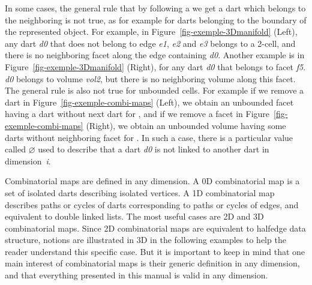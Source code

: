 In some cases, the general rule that by following a \betai{} we get a
dart which belongs to the neighboring  is not true, as for example
for darts belonging to the boundary of the represented
object. For example, in Figure~\ref{fig-exemple-3Dmanifold} (Left), any dart
\emph{d0} that does not belong to edge \emph{e1}, \emph{e2} and \emph{e3}
belongs to a 2-cell, and there is no neighboring facet along the edge containing \emph{d0}.
Another example is in Figure~\ref{fig-exemple-3Dmanifold} (Right), for
any dart \emph{d0} that belongs to facet \emph{f5}.
\emph{d0} belongs to volume \emph{vol2}, but there is no neighboring volume
along this facet.  The general rule is also not true for unbounded
cells. For example if we remove a dart in
Figure~\ref{fig-exemple-combi-maps} (Left), we obtain an unbounded
facet having a dart without next dart for \betaun{}, and if we remove
a facet in Figure~\ref{fig-exemple-combi-maps} (Right), we obtain an
unbounded volume having some darts without neighboring facet for
\betadeux{}.  In such a case, there is a particular value called
$\varnothing$ used to describe that a dart \emph{d0} is not linked to
another dart in dimension~\emph{i}.


Combinatorial maps are defined in any dimension. A 0D combinatorial
map is a set of isolated darts describing isolated vertices. A 1D
combinatorial map describes paths or cycles of darts corresponding to
paths or cycles of edges, and equivalent to double linked lists.  The
most useful cases are 2D and 3D combinatorial maps. Since 2D
combinatorial maps are equivalent to halfedge data structure, notions
are illustrated in 3D in the following examples to help the reader 
understand this specific case. But it is important to keep in mind
that one main interest of combinatorial maps is their generic
definition in any dimension, and that everything presented in this
manual is valid in any dimension.

